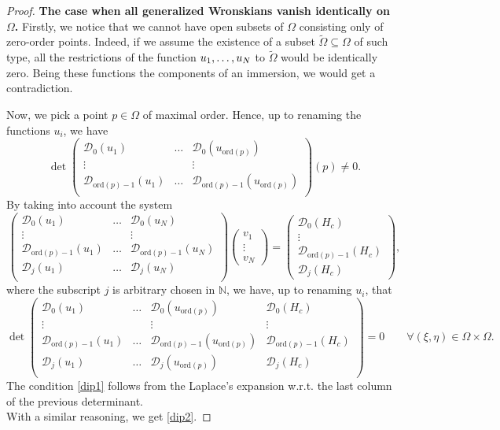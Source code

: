 \documentclass{article}
\newcommand{\ord}{\mathrm{ord}}
\newcommand{\N}{\mathds{N}}
\newcommand{\dd}{\mathcal{D}}
\begin{document}
\begin{proof}
\smallskip
\noindent
\textbf{The case  when all generalized Wronskians vanish identically on $\Omega$.} Firstly, we notice that we cannot have open subsets of $\Omega$ consisting only of zero-order points.
Indeed, if we assume the existence of a subset $\tilde\Omega\subseteq \Omega$ of such type, all the restrictions of the function $u_1,\mathellipsis, u_N$ to $\tilde\Omega$ would be identically zero. Being these functions the components of an immersion, we would get a contradiction.

\smallskip\noindent
Now, we pick a point $p\in\Omega$ of maximal order. Hence, up to renaming the functions $u_i$, we have
$$
\det \begin{pmatrix}
\mathcal{D}_0(u_1)&\dots&\mathcal{D}_0(u_{\ord(p)})\\
\vdots & &\vdots\\
\mathcal{D}_{\ord(p)-1}(u_1)&\dots&\mathcal{D}_{\ord(p)-1}(u_{\ord(p)})\\
\end{pmatrix}(p)\neq 0.$$
 By taking into account the system 
$$\begin{pmatrix}
\mathcal{D}_0(u_1)&\dots&\mathcal{D}_0(u_N)\\
\vdots & &\vdots\\
\mathcal{D}_{\ord(p)-1}(u_1)&\dots&\mathcal{D}_{\ord(p)-1}(u_N)\\
\mathcal{D}_{j}(u_1)&\dots&\mathcal{D}_{j}(u_N)\\
\end{pmatrix}\begin{pmatrix}
 v_1\\
\vdots\\
v_N\end{pmatrix}=\begin{pmatrix}
\mathcal{D}_0(H_c)\\
\vdots\\
\mathcal{D}_{\ord(p)-1}(H_c)\\
\mathcal{D}_{j}(H_c)
\end{pmatrix},$$
where the subscript $j$ is  arbitrary chosen in $\N$,
we have, up to renaming $u_i$, that
$$\det\begin{pmatrix}
\mathcal{D}_0(u_1)&\dots&\mathcal{D}_0(u_{\ord(p)}) &\mathcal{D}_0(H_c)\\
\vdots & &\vdots&\vdots\\
\mathcal{D}_{\ord(p)-1}(u_1)&\dots&\mathcal{D}_{\ord(p)-1}(u_{\ord(p)})&\mathcal{D}_{\ord(p)-1}(H_c)\\
\dd_j(u_1)&\dots& \dd_j(u_{\ord(p)})&\dd_j(H_c)\\
\end{pmatrix}= 0\qquad \forall (\xi,\eta)\in\Omega\times\Omega.$$
The condition \eqref{dip1} follows from the Laplace's expansion w.r.t. the last column of the previous determinant.\\
With a similar reasoning, we get \eqref{dip2}.


\end{proof}
\end{document}
